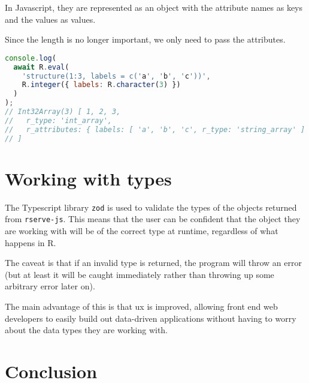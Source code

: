 \documentclass{article}
\newcommand{\pkg}[1]{\texttt{#1}}
\newcommand{\prog}[1]{{\sf #1}}
\newcommand{\R}{\prog{R}}
\begin{document}
In Javascript, they are represented as an object with the attribute names as keys and the values as values.

Since the length is no longer important, we only need to pass the attributes.

\begin{lstlisting}[language=Javascript, numbers=none]
console.log(
  await R.eval(
    'structure(1:3, labels = c('a', 'b', 'c'))',
    R.integer({ labels: R.character(3) })
  )
);
// Int32Array(3) [ 1, 2, 3,
//   r_type: 'int_array',
//   r_attributes: { labels: [ 'a', 'b', 'c', r_type: 'string_array' ] }
// ]
\end{lstlisting}

\section{Working with types}
\label{sec:working-with-types}

The Typescript library \pkg{zod} is used to validate the types of the objects returned from \pkg{rserve-js}.
This means that the user can be confident that the object they are working with will be of the correct type at runtime, regardless of what happens in \R{}.

The caveat is that if an invalid type is returned, the program will throw an error (but at least it will be caught immediately rather than throwing up some arbitrary error later on).

The main advantage of this is that \gls{ux} is improved, allowing front end web developers to easily build out data-driven applications without having to worry about the data types they are working with.

\section{Conclusion}

\printglossaries
\printbibliography
\end{document}
